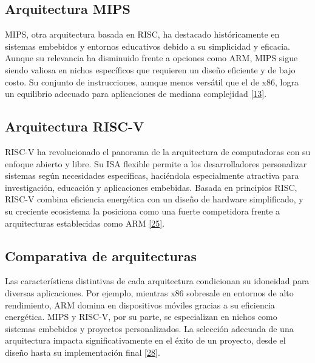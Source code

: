 \documentclass[12pt,oneside]{templates/unerthesis}
\begin{document}
\hypertarget{arquitectura-mips}{%
\subsection{Arquitectura MIPS}\label{arquitectura-mips}}

MIPS, otra arquitectura basada en RISC, ha destacado históricamente en sistemas embebidos y entornos educativos debido a su simplicidad y eficacia. Aunque su relevancia ha disminuido frente a opciones como ARM, MIPS sigue siendo valiosa en nichos específicos que requieren un diseño eficiente y de bajo costo. Su conjunto de instrucciones, aunque menos versátil que el de x86, logra un equilibrio adecuado para aplicaciones de mediana complejidad \protect\hyperlink{ref-hennessy_computer_2012}{{[}13{]}}.

\hypertarget{arquitectura-risc-v}{%
\subsection{Arquitectura RISC-V}\label{arquitectura-risc-v}}

RISC-V ha revolucionado el panorama de la arquitectura de computadoras con su enfoque abierto y libre. Su ISA flexible permite a los desarrolladores personalizar sistemas según necesidades específicas, haciéndola especialmente atractiva para investigación, educación y aplicaciones embebidas. Basada en principios RISC, RISC-V combina eficiencia energética con un diseño de hardware simplificado, y su creciente ecosistema la posiciona como una fuerte competidora frente a arquitecturas establecidas como ARM \protect\hyperlink{ref-waterman_risc-v_2014}{{[}25{]}}.

\hypertarget{comparativa-de-arquitecturas}{%
\subsection{Comparativa de arquitecturas}\label{comparativa-de-arquitecturas}}

Las características distintivas de cada arquitectura condicionan su idoneidad para diversas aplicaciones. Por ejemplo, mientras x86 sobresale en entornos de alto rendimiento, ARM domina en dispositivos móviles gracias a su eficiencia energética. MIPS y RISC-V, por su parte, se especializan en nichos como sistemas embebidos y proyectos personalizados. La selección adecuada de una arquitectura impacta significativamente en el éxito de un proyecto, desde el diseño hasta su implementación final \protect\hyperlink{ref-patterson_computer_2014}{{[}28{]}}.
\end{document}
